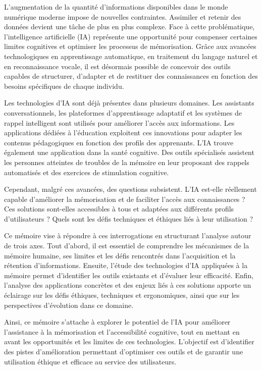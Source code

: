 \documentclass[12pt,a4paper]{report}
\begin{document}
L'augmentation de la quantité d'informations disponibles dans le monde numérique moderne impose de nouvelles contraintes. Assimiler et retenir des données devient une tâche de plus en plus complexe. Face à cette problématique, l'intelligence artificielle (IA) représente une opportunité pour compenser certaines limites cognitives et optimiser les processus de mémorisation. Grâce aux avancées technologiques en apprentissage automatique, en traitement du langage naturel et en reconnaissance vocale, il est désormais possible de concevoir des outils capables de structurer, d'adapter et de restituer des connaissances en fonction des besoins spécifiques de chaque individu.

Les technologies d'IA sont déjà présentes dans plusieurs domaines. Les assistants conversationnels, les plateformes d'apprentissage adaptatif et les systèmes de rappel intelligent sont utilisés pour améliorer l'accès aux informations. Les applications dédiées à l'éducation exploitent ces innovations pour adapter les contenus pédagogiques en fonction des profils des apprenants. L'IA trouve également une application dans la santé cognitive. Des outils spécialisés assistent les personnes atteintes de troubles de la mémoire en leur proposant des rappels automatisés et des exercices de stimulation cognitive.

Cependant, malgré ces avancées, des questions subsistent. L'IA est-elle réellement capable d'améliorer la mémorisation et de faciliter l'accès aux connaissances ? Ces solutions sont-elles accessibles à tous et adaptées aux différents profils d'utilisateurs ? Quels sont les défis techniques et éthiques liés à leur utilisation ?

\newpage
Ce mémoire vise à répondre à ces interrogations en structurant l'analyse autour de trois axes. Tout d'abord, il est essentiel de comprendre les mécanismes de la mémoire humaine, ses limites et les défis rencontrés dans l'acquisition et la rétention d'informations. Ensuite, l'étude des technologies d'IA appliquées à la mémoire permet d'identifier les outils existants et d'évaluer leur efficacité. Enfin, l'analyse des applications concrètes et des enjeux liés à ces solutions apporte un éclairage sur les défis éthiques, techniques et ergonomiques, ainsi que sur les perspectives d'évolution dans ce domaine.

Ainsi, ce mémoire s'attache à explorer le potentiel de l'IA pour améliorer l'assistance à la mémorisation et l'accessibilité cognitive, tout en mettant en avant les opportunités et les limites de ces technologies. L'objectif est d'identifier des pistes d'amélioration permettant d'optimiser ces outils et de garantir une utilisation éthique et efficace au service des utilisateurs.
\end{document}
